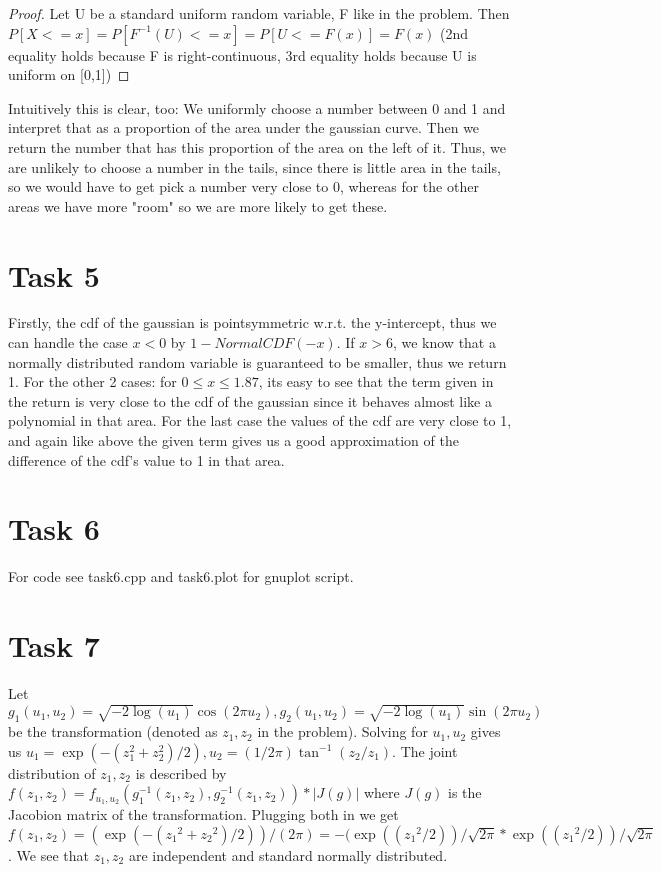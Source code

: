 \documentclass[]{article}
\begin{document}
\begin{proof}
Let U be a standard uniform random variable, F like in the problem. Then
$P[X<=x]=P[F^{-1}(U)<=x]=P[U<=F(x)]=F(x)$ (2nd equality holds because F is
right-continuous, 3rd equality holds because U is uniform on [0,1])
\end{proof}

Intuitively this is clear, too: We uniformly choose a number between 0 and 1 and
interpret that as a proportion of the area under the gaussian curve. Then we
return the number that has this proportion of the area on the left of it. Thus,
we are unlikely to choose a number in the tails, since there is little area in
the tails, so we would have to get pick a number very close to 0, whereas for
the other areas we have more "room" so we are more likely to get these.

\section*{Task 5} Firstly, the cdf of the gaussian is pointsymmetric w.r.t. the
y-intercept, thus we can handle the case $x<0$ by $1-NormalCDF(-x)$. If $x>6$,
we know that a normally distributed random variable is guaranteed to be smaller,
thus we return 1. For the other 2 cases: for $0\le x\le 1.87$, its easy to see
that the term given in the return is very close to the cdf of the gaussian since
it behaves almost like a polynomial in that area. For the last case the values
of the cdf are very close to 1, and again like above the given term gives us a
good approximation of the difference of the cdf's value to 1 in that area.

\section*{Task 6} For code see task6.cpp and task6.plot for gnuplot script.

\section*{Task 7} Let $g_1(u_1,u_2)=\sqrt{-2\log(u_1)}\cos(2\pi
u_2),g_2(u_1,u_2)=\sqrt{-2\log(u_1)}\sin(2\pi u_2)$ be the transformation
(denoted as $z_1, z_2$ in the problem). Solving for $u_1,u_2$ gives us $u_1 =
\exp({-(z_1 ^2+ z_2 ^2)/2}),u_2 = (1/2\pi)\tan^{-1} (z_2/z_1)$. The joint
distribution of $z_1, z_2$ is described by $ f(z_1 ,z_2) = f_{u_1,
u_2}(g_1^{-1}(z_1,z_2),g_2^{-1}(z_1,z_2)) * | J(g) |$ where $J(g)$ is the
Jacobion matrix of the transformation. Plugging both in we get
$f(z_1,z_2)=(\exp(-({z_1}^2+{z_2}^2)/2))/(2\pi)=-(\exp(({z_1}^2/2))/\sqrt{2\pi}*\exp(({z_1}^2/2))/\sqrt{2\pi}$.
We see that $z_1,z_2$ are independent and standard normally distributed.
\end{document}
